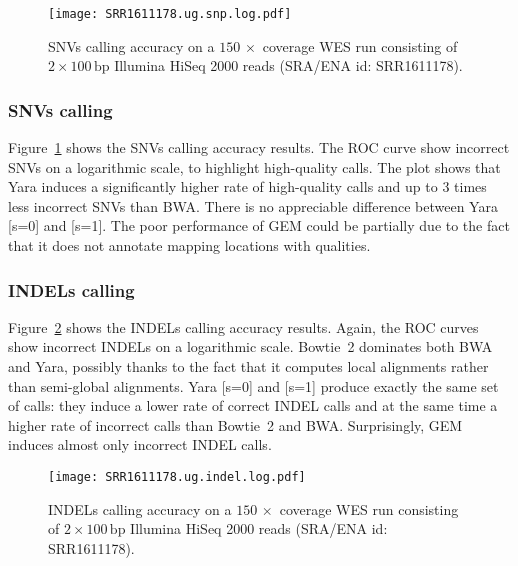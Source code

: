 \begin{figure}[t]
\begin{center}
\caption[Yara SNVs calling accuracy]{SNVs calling accuracy on a $150\, \times$ coverage WES run consisting of $2 \times 100\,\text{bp}$ Illumina HiSeq 2000 reads (SRA/ENA id: SRR1611178).}
\label{fig:yara:calling-snps}
\texttt{[image: SRR1611178.ug.snp.log.pdf]}
\end{center}
\end{figure}


\subsubsection{SNVs calling}
Figure~\ref{fig:yara:calling-snps} shows the SNVs calling accuracy results.
The ROC curve show incorrect SNVs on a logarithmic scale, to highlight high-quality calls.
The plot shows that Yara induces a significantly higher rate of high-quality calls and up to 3 times less incorrect SNVs than BWA.
There is no appreciable difference between Yara [s=0] and [s=1].
The poor performance of GEM could be partially due to the fact that it does not annotate mapping locations with qualities.

\subsubsection{INDELs calling}
Figure~\ref{fig:yara:calling-indels} shows the INDELs calling accuracy results.
Again, the ROC curves show incorrect INDELs on a logarithmic scale.
Bowtie~2 dominates both BWA and Yara, possibly thanks to the fact that it computes local alignments rather than semi-global alignments.
Yara [s=0] and [s=1] produce exactly the same set of calls: they induce a lower rate of correct INDEL calls and at the same time a higher rate of incorrect calls than Bowtie~2 and BWA.
Surprisingly, GEM induces almost only incorrect INDEL calls.

\begin{figure}[t]
\begin{center}
\caption[Yara INDELs calling accuracy]{INDELs calling accuracy on a $150\, \times$ coverage WES run consisting of $2 \times 100\,\text{bp}$ Illumina HiSeq 2000 reads (SRA/ENA id: SRR1611178).}
\label{fig:yara:calling-indels}
\texttt{[image: SRR1611178.ug.indel.log.pdf]}
\end{center}
\end{figure}

